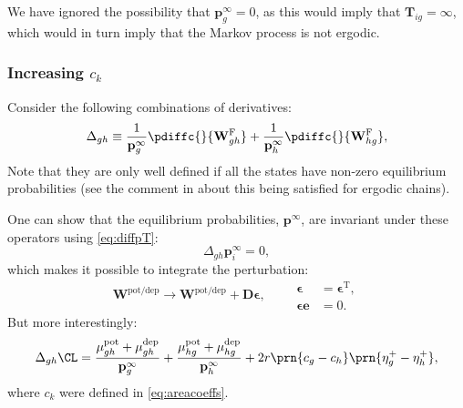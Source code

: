 \documentclass{article} %
\newcommand{\trans}{^\mathrm{T}}
\newcommand{\onev}{\mathbf{e}}
\newcommand{\pr}{\mathbf{p}}
\newcommand{\eq}{\pr^\infty}
\newcommand{\fpt}{\mathbf{T}}
\newcommand{\D}{\mathbf{D}}
\newcommand{\W}{\mathbf{W}}
\newcommand{\enc}{\mathbf{q}}
\newcommand{\frg}{\W^{\mathrm{F}}}
\newcommand{\pot}{^{\text{pot}}}
\newcommand{\dep}{^{\text{dep}}}
\newcommand{\potdep}{^{\text{pot/dep}}}
\begin{document}
We have ignored the possibility that $\eq_g=0$, as this would imply that $\fpt_{ig}=\infty$, which would in turn imply that the Markov process is not ergodic.


\subsubsection{Increasing \texorpdfstring{$c_k$}{c(k)}}\label{sec:areacoeffincr}

Consider the following combinations of derivatives:
%
\begin{align}
\label{eq:areacoeffincrderiv}
    \Delta_{gh} &\equiv
      \frac{1}{\eq_{g}} \pdiffc{}{\frg_{gh}}
      + \frac{1}{\eq_h} \pdiffc{}{\frg_{hg}}, \\
\end{align}
%
Note that they are only well defined if all the states have non-zero equilibrium probabilities (see the comment in  about this being satisfied for ergodic chains).

One can show that the equilibrium probabilities, $\eq$, are invariant under these operators using \eqref{eq:diffpT}:
%
\begin{equation}\label{eq:sareacoeffincrprob}
  \Delta_{gh} \eq_i = 0,
\end{equation}
%
which makes it possible to integrate the perturbation:
%
\begin{equation}\label{eq:areacoeffincrfinite}
  \W\potdep  \to \W\potdep  + \D\boldsymbol{\epsilon},
  \qquad
  \begin{aligned}
  \boldsymbol{\epsilon} &= \boldsymbol{\epsilon}\trans,
  \\
  \boldsymbol{\epsilon} \onev &= 0.
  \end{aligned}
\end{equation}
%
But more interestingly:
%
\begin{align}
\label{eq:areacoeffincr}
    \Delta_{gh}\CL &=
      \frac{\mu\pot _{gh}+\mu\dep _{gh}}{\eq_g} + \frac{\mu\pot _{hg}+\mu\dep _{hg}}{\eq_h}
      + 2r\prn{c_g-c_h}\prn{\eta^+_{g} - \eta^+_{h}},\\
\end{align}
%
where $c_k$ were defined in \eqref{eq:areacoeffs}.
\end{document}
